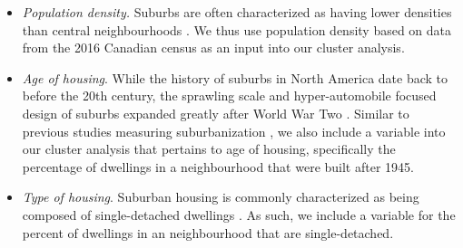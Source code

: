 \begin{itemize}
	\item \textit{Population density.} Suburbs are often characterized as having lower densities than central neighbourhoods \cite{torrens2000measuring,hanibuchi_does_2012, massey_suburbanization_2018,airgood-obrycki_suburban_2019}. We thus use population density based on data from the 2016 Canadian census as an input into our cluster analysis.
	
	\item \textit{Age of housing}. While the history of suburbs in North America date back to before the 20th century, the sprawling scale and hyper-automobile focused design of suburbs expanded greatly after World War Two \cite{airgood-obrycki_suburban_2019,harris_creeping_2020}. Similar to previous studies measuring suburbanization \cite{hanibuchi_does_2012,ades_is_2016,airgood-obrycki_suburban_2019}, we also include a variable into our cluster analysis that pertains to age of housing, specifically the percentage of dwellings in a neighbourhood that were built after 1945.
	
	\item \textit{Type of housing}. Suburban housing is commonly characterized as being composed of single-detached dwellings 	\cite{moos_suburban_2015, ades_is_2016}. 
	As such, we include a variable for the percent of dwellings in an neighbourhood that are single-detached.
	

\end{itemize}

